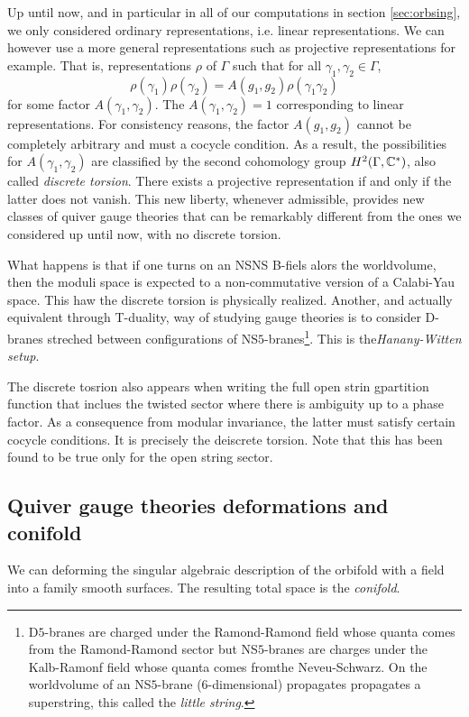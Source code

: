         Up until now, and in particular in all of our computations in section \ref{sec:orbsing}, we only considered ordinary representations, i.e. linear representations. We can however use a more general representations such as projective representations for example. That is, representations $\rho$ of $\Gamma$ such that for all $\gamma_1,\gamma_2\in\Gamma$,
        \begin{equation}
            \rho(\gamma_1)\rho(\gamma_2)=A(g_1,g_2)\rho(\gamma_1\gamma_2)
        \end{equation}
        for some factor $A(\gamma_1,\gamma_2)$. The $A(\gamma_1,\gamma_2)=1$ corresponding to linear representations. For consistency reasons, the factor $A(g_1,g_2)$ cannot be completely arbitrary and must a cocycle condition. As a result, the possibilities for $A(\gamma_1,\gamma_2)$ are classified by the second cohomology group $H^2(\Gamma,\mathbb{C}^*)$, also called \emph{discrete torsion}. There exists a projective representation if and only if the latter does not vanish. This new liberty, whenever admissible, provides new classes of quiver gauge theories that can be remarkably different from the ones we considered up until now, with no discrete torsion.

        What happens is that if one turns on an NSNS B-fiels alors the worldvolume, then the moduli space is expected to a non-commutative version of a Calabi-Yau space. This haw the discrete torsion is physically realized. Another, and actually equivalent through T-duality, way of studying gauge theories is to consider D-branes streched between configurations of NS$5$-branes\footnote{D$5$-branes are charged under the Ramond-Ramond field whose quanta comes from the Ramond-Ramond sector but NS$5$-branes are charges under the Kalb-Ramonf field whose quanta comes fromthe Neveu-Schwarz. On the worldvolume of an NS$5$-brane (6-dimensional) propagates propagates a superstring, this called the \emph{little string}.}. This is the\emph{Hanany-Witten setup}.

        The discrete tosrion also appears when writing the full open strin gpartition function that inclues the twisted sector where there is ambiguity up to a phase factor. As a consequence from modular invariance, the latter must satisfy certain cocycle conditions. It is precisely the deiscrete torsion. Note that this has been found to be true only for the open string sector.

    \subsection{Quiver gauge theories deformations and conifold}

        We can deforming the singular algebraic description of the orbifold with a field into a family smooth surfaces. The resulting total space is the \emph{conifold}.